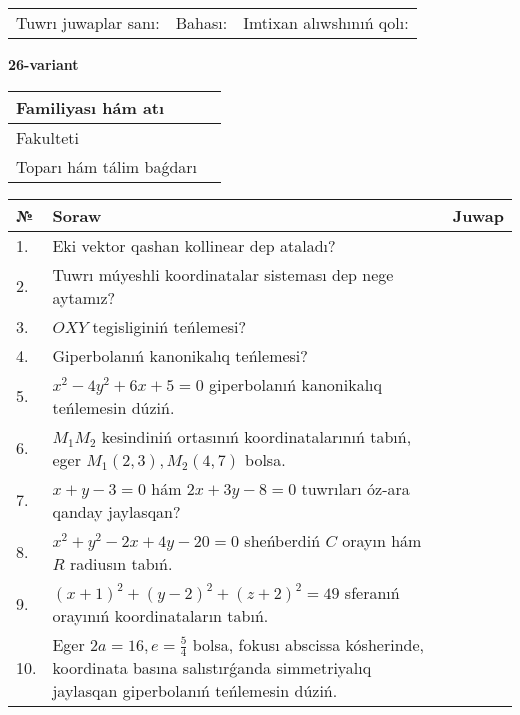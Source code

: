\documentclass{article}
\begin{document}
\vspace{1cm}

\begin{tabular}{lll}
Tuwrı juwaplar sanı: \underline{\hspace{1.5cm}} & 
Bahası: \underline{\hspace{1.5cm}} & 
Imtixan alıwshınıń qolı: \underline{\hspace{2cm}} \\
\end{tabular}

\egroup

\newpage


\textbf{26-variant}\\

\bgroup
\def\arraystretch{1.6} %

\begin{tabular}{|m{5.7cm}|m{9.5cm}|}
\hline
Familiyası hám atı & \\
\hline
Fakulteti  & \\
\hline
Toparı hám tálim baǵdarı  & \\
\hline
\end{tabular}

\vspace{1cm}

\begin{tabular}{|m{0.7cm}|m{10cm}|m{4cm}|}
\hline
№ & Soraw & Juwap \\
\hline
1. & Eki vektor qashan kollinear dep ataladı? &  \\
\hline
2. & Tuwrı múyeshli koordinatalar sisteması dep nege aytamız? &  \\
\hline
3. & $OXY$ tegisliginiń teńlemesi? &  \\
\hline
4. & Giperbolanıń kanonikalıq teńlemesi? &  \\
\hline
5. & $x^{2}-4y^{2}+6x+5=0$ giperbolanıń kanonikalıq teńlemesin dúziń. &  \\
\hline
6. & $M_{1}M_{2}$ kesindiniń ortasınıń koordinatalarınıń tabıń, eger $M_{1} (2, 3), M_{2} (4, 7)$ bolsa. &  \\
\hline
7. & $x+y-3=0$ hám $2x+3y-8=0$ tuwrıları óz-ara qanday jaylasqan? &  \\
\hline
8. & $x^{2}+y^{2}-2x+4y-20=0$ sheńberdiń $C$ orayın hám $R$ radiusın tabıń. &  \\
\hline
9. & $(x+1)^{2}+(y-2) ^{2}+(z+2) ^{2}=49$ sferanıń orayınıń koordinataların tabıń. &  \\
\hline
10. & Eger $2a=16, e=\frac{5}{4}$ bolsa, fokusı abscissa kósherinde, koordinata basına salıstırǵanda simmetriyalıq jaylasqan giperbolanıń teńlemesin dúziń. &  \\
\hline
\end{tabular}
\end{document}
